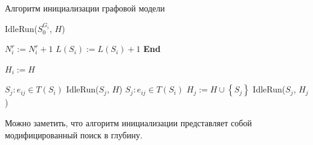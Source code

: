 \begin{algorithm}[H]
	\caption{Алгоритм инициализации графовой модели}
	\label{lst:pycomsdk_init}
	\begin{algorithmic}[1]
		 
		\State IdleRun($S_0^{G_i}$, $H$) 
		\EndIf{}

		\State $N_i^r := N_i^r + 1$
		 
		\State $L(S_i) := L(S_i) + 1$
		\EndIf{}
		\State \textbf{End}
		\EndIf{}

		\State $H_i := H$
		\EndIf{}

		\State $S_j: e_{ij}\in T(S_i)$
		\State IdleRun($S_j$, $H$)
		\Else{}
		\State $S_j: e_{ij}\in T(S_i)$
		\State $H_j := H \cup \left\{S_j\right\}$
		\State IdleRun($S_j$, $H_j$)
		\EndFor
		\EndIf{}

		\EndFunction
	\end{algorithmic}
\end{algorithm}
Можно заметить, что алгоритм инициализации представляет собой модифицированный поиск в глубину.

